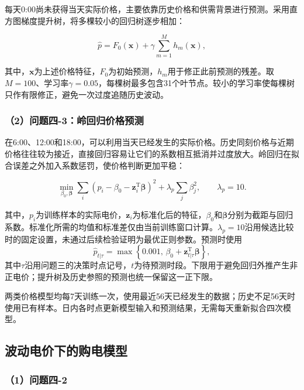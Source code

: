 每天0:00尚未获得当天实际价格，主要依靠历史价格和供需背景进行预测。采用直方图梯度提升树，将多棵较小的回归树逐步相加：

\begin{equation}
\hat{p}
=
F_0(\mathbf{x})
+
\gamma
\sum_{m=1}^{M}
h_m(\mathbf{x}),
\end{equation}

其中，$\mathbf{x}$为上述价格特征，$F_0$为初始预测，$h_m$用于修正此前预测的残差。取$M=100$、学习率$\gamma=0.05$，每棵树最多包含31个叶节点。较小的学习率使每棵树只作有限修正，避免一次过度追随历史波动。

\subsubsection*{（2）问题四-3：岭回归价格预测}

在6:00、12:00和18:00，可以利用当天已经发生的实际价格。历史同刻价格与近期价格往往较为接近，直接回归容易让它们的系数相互抵消并过度放大。岭回归在拟合误差之外加入系数惩罚，使价格判断更加平稳：

\begin{equation}
\min_{\beta_0,\boldsymbol{\beta}}
\sum_i
\left(
p_i-\beta_0-\mathbf{z}_i^{\mathrm T}\boldsymbol{\beta}
\right)^2
+
\lambda_p
\sum_j\beta_j^2,
\qquad
\lambda_p=10.
\end{equation}

其中，$p_i$为训练样本的实际电价，$\mathbf{z}_i$为标准化后的特征，$\beta_0$和$\boldsymbol{\beta}$分别为截距与回归系数。标准化所需的均值和标准差仅由当前训练窗口计算。$\lambda_p=10$沿用候选比较时的固定设置，未通过后续检验证明为最优正则参数。预测时使用
\begin{equation}
\hat p_{t|\tau}=\max\left\{0.001,\,\beta_0+\mathbf{z}_{t|\tau}^{\mathrm T}\boldsymbol{\beta}\right\},
\end{equation}
其中$\tau$沿用问题三的决策时点记号，$t$为待预测时段。下限用于避免回归外推产生非正电价；提升树及历史参照的预测也统一保留这一正下限。

两类价格模型均每7天训练一次，使用最近56天已经发生的数据；历史不足56天时使用已有样本。日内各时点更新模型输入和预测结果，无需每天重新拟合四次模型。

\subsection{波动电价下的购电模型}

\subsubsection*{（1）问题四-2}


